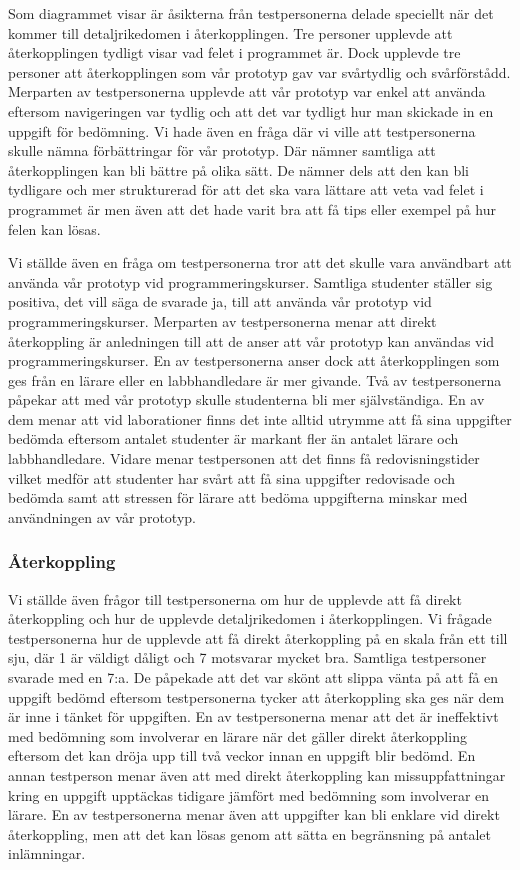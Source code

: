 \documentclass[a4paper,11pt]{article}
\begin{document}
{Som diagrammet visar är åsikterna från testpersonerna delade speciellt när det kommer till detaljrikedomen i återkopplingen. Tre personer upplevde att återkopplingen tydligt visar vad felet i programmet är. Dock upplevde tre personer att återkopplingen som vår prototyp gav var svårtydlig och svårförstådd. Merparten av testpersonerna upplevde att vår prototyp var enkel att använda eftersom navigeringen var tydlig och att det var tydligt hur man skickade in en uppgift för bedömning. 
Vi hade även en fråga där vi ville att testpersonerna skulle nämna förbättringar för vår prototyp. Där nämner samtliga att återkopplingen kan bli bättre på olika sätt. De nämner dels att den kan bli tydligare och mer strukturerad för att det ska vara lättare att veta vad felet i programmet är men även att det hade varit bra att få tips eller exempel på hur felen kan lösas. 

Vi ställde även en fråga om testpersonerna tror att det skulle vara användbart att använda vår prototyp vid programmeringskurser. Samtliga studenter ställer sig positiva, det vill säga de svarade ja, till att använda vår prototyp vid programmeringskurser. Merparten av testpersonerna menar att direkt återkoppling är anledningen till att de anser att vår prototyp kan användas vid programmeringskurser. En av testpersonerna anser dock att återkopplingen som ges från en lärare eller en labbhandledare är mer givande. Två av testpersonerna påpekar att med vår prototyp skulle studenterna bli mer självständiga. En av dem menar att vid laborationer finns det inte alltid utrymme att få sina uppgifter bedömda eftersom antalet studenter är markant fler än antalet lärare och labbhandledare. Vidare menar testpersonen att det finns få redovisningstider vilket medför att studenter har svårt att få sina uppgifter redovisade och bedömda samt att stressen för lärare att bedöma uppgifterna minskar med användningen av vår prototyp.

\newpage
\subsubsection{Återkoppling}

Vi ställde även frågor till testpersonerna om hur de upplevde att få direkt återkoppling och hur de upplevde detaljrikedomen i återkopplingen. Vi frågade testpersonerna hur de upplevde att få direkt återkoppling på en skala från ett till sju, där 1 är väldigt dåligt och 7 motsvarar mycket bra.
Samtliga testpersoner svarade med en 7:a. De påpekade att det var skönt att slippa vänta på att få en uppgift bedömd eftersom testpersonerna tycker att återkoppling ska ges när dem är inne i tänket för uppgiften. En av testpersonerna menar att det är ineffektivt med bedömning som involverar en lärare när det gäller direkt återkoppling eftersom det kan dröja upp till två veckor innan en uppgift blir bedömd. En annan testperson menar även att med direkt återkoppling kan missuppfattningar kring en uppgift upptäckas tidigare jämfört med bedömning som involverar en lärare. En av testpersonerna menar även att uppgifter kan bli enklare vid direkt återkoppling, men att det kan lösas genom att sätta en begränsning på antalet inlämningar.

}
\end{document}

